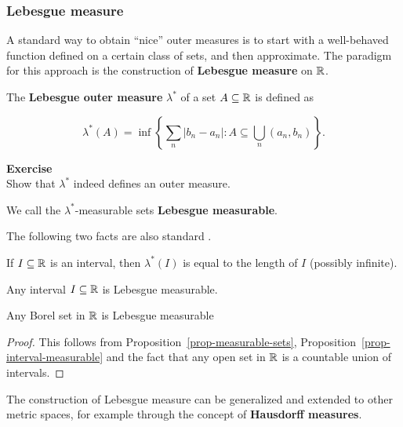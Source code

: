 \subsubsection{Lebesgue measure}

A standard way to obtain ``nice'' outer measures is to start with a well-behaved function defined on a certain class of sets, and then approximate. The paradigm for this approach is the construction of \textbf{Lebesgue measure} on $\mathbb{R}$.

\begin{definition}\label{def-lebesgue}The \textbf{Lebesgue outer measure} $\lambda^*$ of a set $A \subseteq \mathbb{R}$ is defined as

\begin{equation}
\lambda^*(A) = \inf \left \{ \sum_n |b_n - a_n| \colon A \subseteq \bigcup_n (a_n,b_n) \right \}.
\end{equation}

\end{definition}\begin{framed}
\textbf{Exercise}\\
Show that $\lambda^*$ indeed defines an outer measure.
\end{framed}

We call the $\lambda^*$-measurable sets \textbf{Lebesgue measurable}.

The following two facts are also standard \cite{RoydenFitzpatrick_1988n}.

\begin{proposition}\label{prop-outer-meas-interval}If $I \subseteq \mathbb{R}$ is an interval, then $\lambda^*(I)$ is equal to the length of $I$ (possibly infinite).

\end{proposition}\begin{proposition}\label{prop-interval-measurable}Any interval $I \subseteq \mathbb{R}$ is Lebesgue measurable.

\end{proposition}\begin{corollary}\label{cor-borel-measurable}Any Borel set in $\mathbb{R}$ is Lebesgue measurable

\end{corollary}\begin{proof}This follows from Proposition~\ref{prop-measurable-sets}, Proposition~\ref{prop-interval-measurable} and the fact that any open set in $\mathbb{R}$ is a countable union of intervals.

\end{proof}The construction of Lebesgue measure can be generalized and extended to other metric spaces, for example through the concept of \textbf{Hausdorff measures}.

